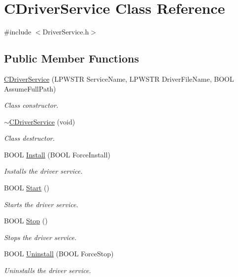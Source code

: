 \hypertarget{class_c_driver_service}{}\section{C\+Driver\+Service Class Reference}
\label{class_c_driver_service}


{\ttfamily \#include $<$Driver\+Service.\+h$>$}

\subsection*{Public Member Functions}
\begin{DoxyCompactItemize}
\item 
\mbox{\hyperlink{class_c_driver_service_acdcd46c37c40d811eb96dadc902ee3a9}{C\+Driver\+Service}} (L\+P\+W\+S\+TR Service\+Name, L\+P\+W\+S\+TR Driver\+File\+Name, B\+O\+OL Assume\+Full\+Path)
\begin{DoxyCompactList}\small\item\em Class constructor. \end{DoxyCompactList}\item 
\mbox{\hyperlink{class_c_driver_service_af5f00554519b7d44fe12fc9a7c968718}{$\sim$\+C\+Driver\+Service}} (void)
\begin{DoxyCompactList}\small\item\em Class destructor. \end{DoxyCompactList}\item 
B\+O\+OL \mbox{\hyperlink{class_c_driver_service_a82ac4ca0202256a3f27c3d38a60a8d37}{Install}} (B\+O\+OL Force\+Install)
\begin{DoxyCompactList}\small\item\em Installs the driver service. \end{DoxyCompactList}\item 
B\+O\+OL \mbox{\hyperlink{class_c_driver_service_a148e17da476c4fdc6028f257369fa184}{Start}} ()
\begin{DoxyCompactList}\small\item\em Starts the driver service. \end{DoxyCompactList}\item 
B\+O\+OL \mbox{\hyperlink{class_c_driver_service_a13872e379fe113d50a9592d2b6afbfa2}{Stop}} ()
\begin{DoxyCompactList}\small\item\em Stops the driver service. \end{DoxyCompactList}\item 
B\+O\+OL \mbox{\hyperlink{class_c_driver_service_a52b6dc6a44270d9069f0e450d5a839d4}{Uninstall}} (B\+O\+OL Force\+Stop)
\begin{DoxyCompactList}\small\item\em Uninstalls the driver service. \end{DoxyCompactList}\end{DoxyCompactItemize}


